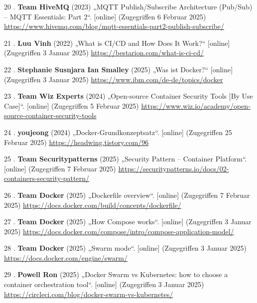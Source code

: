 \documentclass[
    headings=optiontotocandhead,%
    twoside,
    numbers=noenddot,%
    12pt, %
    titlepage, %
    parskip=full, %
    listof=leveldown, 
    numbers=noenddot, %
    a4paper,DIV=14,
    BCOR=15mm,
]{scrbook}
\newlength{\cslhangindent}
\newenvironment{cslreferences}%
  {\setlength{\parindent}{0pt}%
  \everypar{\setlength{\hangindent}{\cslhangindent}}\ignorespaces}%
  {\par}
\begin{document}
\begin{cslreferences}
\leavevmode\hypertarget{ref-mqtt-hivemq}{}%
20 . \textbf{Team HiveMQ} (2023) „MQTT Publish/Subscribe Architecture
(Pub/Sub) -- MQTT Essentials: Part 2``. {[}online{]} (Zugegriffen 6
Februar 2025)
\url{https://www.hivemq.com/blog/mqtt-essentials-part2-publish-subscribe/}

\leavevmode\hypertarget{ref-bestarion}{}%
21 . \textbf{Luu Vinh} (2022) „What is CI/CD and How Does It Work?{}``
{[}online{]} (Zugegriffen 3 Januar 2025)
\url{https://bestarion.com/what-is-ci-cd/}

\leavevmode\hypertarget{ref-ibm-docker}{}%
22 . \textbf{Stephanie Susnjara Ian Smalley} (2025) „Was ist Docker?{}``
{[}online{]} (Zugegriffen 3 Januar 2025)
\url{https://www.ibm.com/de-de/topics/docker}

\leavevmode\hypertarget{ref-docker-security}{}%
23 . \textbf{Team Wiz Experts} (2024) „Open-source Container Security
Tools {[}By Use Case{]}``. {[}online{]} (Zugegriffen 5 Februar 2025)
\url{https://www.wiz.io/academy/open-source-container-security-tools}

\leavevmode\hypertarget{ref-docker-image-layers}{}%
24 . \textbf{youjeong} (2024) „Docker-Grundkonzeptsatz``. {[}online{]}
(Zugegriffen 25 Februar 2025) \url{https://headwing.tistory.com/96}

\leavevmode\hypertarget{ref-container-overview}{}%
25 . \textbf{Team Securitypatterns} (2025) „Security Pattern --
Container Platform``. {[}online{]} (Zugegriffen 7 Februar 2025)
\url{https://securitypatterns.io/docs/02-containers-security-pattern/}

\leavevmode\hypertarget{ref-docker-dockerfile}{}%
26 . \textbf{Team Docker} (2025) „Dockerfile overview``. {[}online{]}
(Zugegriffen 7 Februar 2025)
\url{https://docs.docker.com/build/concepts/dockerfile/}

\leavevmode\hypertarget{ref-docker-compose}{}%
27 . \textbf{Team Docker} (2025) „How Compose works``. {[}online{]}
(Zugegriffen 3 Januar 2025)
\url{https://docs.docker.com/compose/intro/compose-application-model/}

\leavevmode\hypertarget{ref-docker-swarm}{}%
28 . \textbf{Team Docker} (2025) „Swarm mode``. {[}online{]}
(Zugegriffen 3 Januar 2025) \url{https://docs.docker.com/engine/swarm/}

\leavevmode\hypertarget{ref-circleci-blog}{}%
29 . \textbf{Powell Ron} (2025) „Docker Swarm vs Kubernetes: how to
choose a container orchestration tool``. {[}online{]} (Zugegriffen 3
Januar 2025) \url{https://circleci.com/blog/docker-swarm-vs-kubernetes/}


\end{cslreferences}
\end{document}
